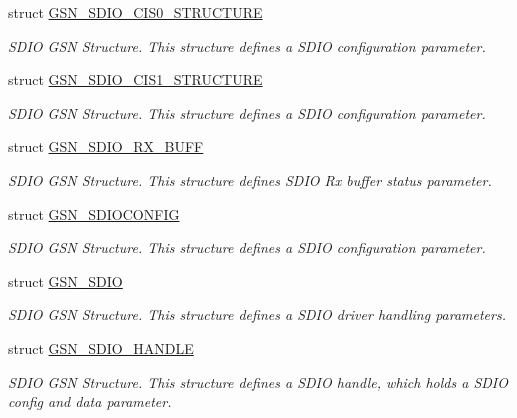 \begin{DoxyCompactItemize}
struct \hyperlink{a00217}{GSN\_\-SDIO\_\-CIS0\_\-STRUCTURE}
\begin{DoxyCompactList}\small\item\em SDIO GSN Structure. This structure defines a SDIO configuration parameter. \end{DoxyCompactList}\item 
struct \hyperlink{a00218}{GSN\_\-SDIO\_\-CIS1\_\-STRUCTURE}
\begin{DoxyCompactList}\small\item\em SDIO GSN Structure. This structure defines a SDIO configuration parameter. \end{DoxyCompactList}\item 
struct \hyperlink{a00225}{GSN\_\-SDIO\_\-RX\_\-BUFF}
\begin{DoxyCompactList}\small\item\em SDIO GSN Structure. This structure defines SDIO Rx buffer status parameter. \end{DoxyCompactList}\item 
struct \hyperlink{a00226}{GSN\_\-SDIOCONFIG}
\begin{DoxyCompactList}\small\item\em SDIO GSN Structure. This structure defines a SDIO configuration parameter. \end{DoxyCompactList}\item 
struct \hyperlink{a00216}{GSN\_\-SDIO}
\begin{DoxyCompactList}\small\item\em SDIO GSN Structure. This structure defines a SDIO driver handling parameters. \end{DoxyCompactList}\item 
struct \hyperlink{a00224}{GSN\_\-SDIO\_\-HANDLE}
\begin{DoxyCompactList}\small\item\em SDIO GSN Structure. This structure defines a SDIO handle, which holds a SDIO config and data parameter. \end{DoxyCompactList}\end{DoxyCompactItemize}
